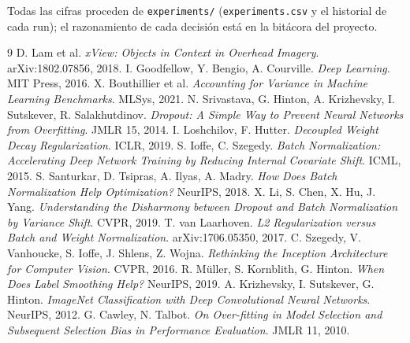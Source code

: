 Todas las cifras proceden de \texttt{experiments/} (\texttt{experiments.csv} y el historial de cada run); el
razonamiento de cada decisión está en la bitácora del proyecto.

\begin{thebibliography}{9}\small
{} D. Lam et al. \emph{xView: Objects in Context in Overhead Imagery}. arXiv:1802.07856, 2018.
 I. Goodfellow, Y. Bengio, A. Courville. \emph{Deep Learning}. MIT Press, 2016.
 X. Bouthillier et al. \emph{Accounting for Variance in Machine Learning Benchmarks}. MLSys, 2021.
 N. Srivastava, G. Hinton, A. Krizhevsky, I. Sutskever, R. Salakhutdinov. \emph{Dropout: A Simple Way to Prevent Neural Networks from Overfitting}. JMLR 15, 2014.
 I. Loshchilov, F. Hutter. \emph{Decoupled Weight Decay Regularization}. ICLR, 2019.
 S. Ioffe, C. Szegedy. \emph{Batch Normalization: Accelerating Deep Network Training by Reducing Internal Covariate Shift}. ICML, 2015.
 S. Santurkar, D. Tsipras, A. Ilyas, A. Madry. \emph{How Does Batch Normalization Help Optimization?} NeurIPS, 2018.
 X. Li, S. Chen, X. Hu, J. Yang. \emph{Understanding the Disharmony between Dropout and Batch Normalization by Variance Shift}. CVPR, 2019.
 T. van Laarhoven. \emph{L2 Regularization versus Batch and Weight Normalization}. arXiv:1706.05350, 2017.
 C. Szegedy, V. Vanhoucke, S. Ioffe, J. Shlens, Z. Wojna. \emph{Rethinking the Inception Architecture for Computer Vision}. CVPR, 2016.
 R. Müller, S. Kornblith, G. Hinton. \emph{When Does Label Smoothing Help?} NeurIPS, 2019.
 A. Krizhevsky, I. Sutskever, G. Hinton. \emph{ImageNet Classification with Deep Convolutional Neural Networks}. NeurIPS, 2012.
 G. Cawley, N. Talbot. \emph{On Over-fitting in Model Selection and Subsequent Selection Bias in Performance Evaluation}. JMLR 11, 2010.
\end{thebibliography}
